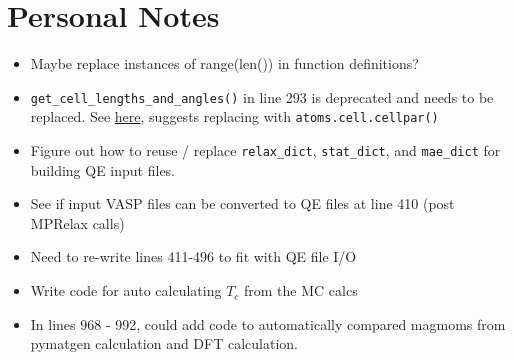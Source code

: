 \documentclass[12pt]{article}
\newcommand{\pmint}[1]{\texttt{#1}}
\begin{document}
\section*{Personal Notes}
\begin{itemize}
    \item Maybe replace instances of range(len()) in function definitions?
    \item \texttt{get_cell_lengths_and_angles()} in line 293 is deprecated and needs to be replaced. See \href{https://wiki.fysik.dtu.dk/ase/releasenotes.html}{here}, suggests replacing with \texttt{atoms.cell.cellpar()}
    \item Figure out how to reuse / replace \pmint{relax_dict}, \pmint{stat_dict}, and \pmint{mae_dict} for building QE input files. 
    \item See if input VASP files can be converted to QE files at line 410 (post MPRelax calls)
    \item Need to re-write lines 411-496 to fit with QE file I/O
    \item Write code for auto calculating $T_c$ from the MC calcs
    \item In lines 968 - 992, could add code to automatically compared magmoms from pymatgen calculation and DFT calculation. 
\end{itemize}
\end{document}
